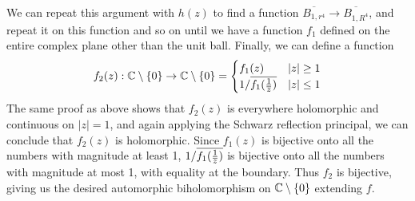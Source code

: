 \documentclass{homework}
\begin{document}
\begin{solution}
                                                                                                                                                                            We can repeat this argument with $h(z)$ to find a function $\overline{B_{1, r^4}} \to\overline{B_{1, R^4}}$, and repeat it on this function and so on until we have a function $f_1$ defined on the entire complex plane other than the unit ball. Finally, we can define a function
                                                                                                                                                                            \[
                                                                                                                                                                            f_2(z): \mathbb{C}\setminus \{0\}\to \mathbb{C}\setminus \{0\} =
                                                                                                                                                                            \begin{cases}
                                                                                                                                                                            f_1(z)& |z| \geq 1\\
                                                                                                                                                                            1/\overline{f_1(\frac{1}{\overline{z}})}&  |z| \leq 1\\
                                                                                                                                                                            \end{cases}
                                                                                                                                                                            \]
                                                                                                                                                                            The same proof as above shows that $f_2(z)$ is everywhere holomorphic and continuous on $|z|=1$, and again applying the Schwarz reflection principal, we can conclude that $f_2(z)$ is holomorphic. Since $f_1(z)$ is bijective onto all the numbers with magnitude at least 1, $1/\overline{f_1(\frac{1}{\overline{z}})}$ is bijective onto all the numbers with magnitude at most 1, with equality at the boundary. Thus $f_2$ is bijective, giving us the desired automorphic biholomorphism on $\mathbb{C}\setminus \{0\}$ extending $f$.
                                                                                                                                                                            \end{solution}
\end{document}
